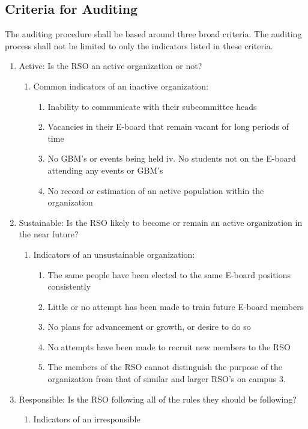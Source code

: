 \documentclass[12pt]{scrreprt}
\begin{document}
\subsection{Criteria for Auditing}
The auditing procedure shall be based around three broad criteria. The auditing process shall not be limited to only the indicators listed in these criteria.
\begin{enumerate}
    \item Active: Is the RSO an active organization or
not?
\begin{enumerate}
    \item Common indicators of an inactive
organization:
\begin{enumerate}
    \item Inability to communicate with their subcommittee heads
    \item Vacancies in their E-board that remain vacant for long periods of time
    \item No GBM’s or events being held iv. No students not on the E-board attending any events or GBM’s
    \item No record or estimation of an active population within
the organization
\end{enumerate}
\end{enumerate}
\item Sustainable: Is the RSO likely to become or remain an active organization in the near future?
\begin{enumerate}
    \item Indicators of an unsustainable
organization:
\begin{enumerate}
    \item The same people have been elected to the same E-board
positions consistently
\item Little or no attempt has been made to train future E-board members
\item No plans for advancement or growth, or desire to do so
\item No attempts have been made to recruit new members to the RSO
\item The members of the RSO cannot distinguish the purpose
of the organization from that of similar and larger RSO’s on campus 3.
\end{enumerate}
\end{enumerate}
\item Responsible: Is the RSO following all of the rules they should be following?
\begin{enumerate}
    \item Indicators of an irresponsible

\end{enumerate}
\end{enumerate}
\end{document}
